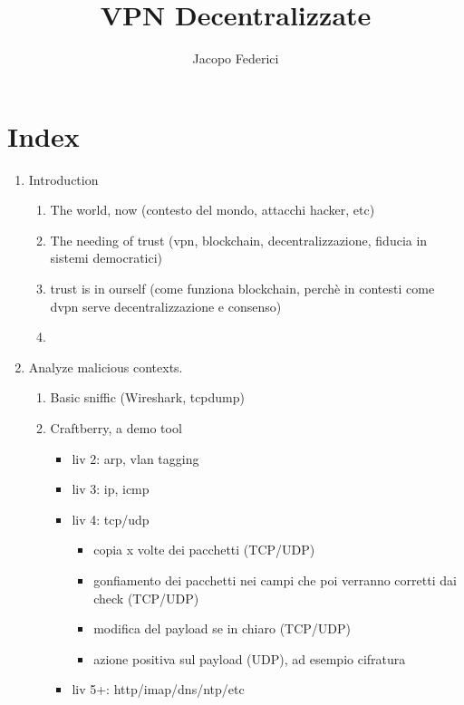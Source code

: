 \documentclass[]{article}
\title{VPN Decentralizzate}
\author{Jacopo Federici}
\begin{document}
	
	\maketitle
	
	\begin{abstract}
		
	\end{abstract}
	
	\section{Index}
	
	\begin{enumerate}
			\item Introduction
				\begin{enumerate}
					\item The world, now (contesto del mondo, attacchi hacker, etc)
					\item The needing of trust (vpn, blockchain, decentralizzazione, fiducia in sistemi democratici)
					\item trust is in ourself (come funziona blockchain, perchè in contesti come dvpn serve decentralizzazione e consenso)
					\item 
				\end{enumerate}
			\item Analyze malicious contexts.
				\begin{enumerate}
					\item Basic sniffic (Wireshark, tcpdump)
					\item Craftberry, a demo tool
					\begin{itemize}
						\item liv 2: arp, vlan tagging
						\item liv 3: ip, icmp
						\item liv 4: tcp/udp
						\begin{itemize}
							\item copia x volte dei pacchetti (TCP/UDP)
							\item gonfiamento dei pacchetti nei campi che poi verranno corretti dai check (TCP/UDP)
							\item modifica del payload se in chiaro (TCP/UDP)
							\item azione positiva sul payload (UDP), ad esempio cifratura
						\end{itemize}
						\item liv 5+: http/imap/dns/ntp/etc
						\begin{itemize}

\end{itemize}
\end{itemize}
\end{enumerate}
\end{enumerate}
\end{document}
